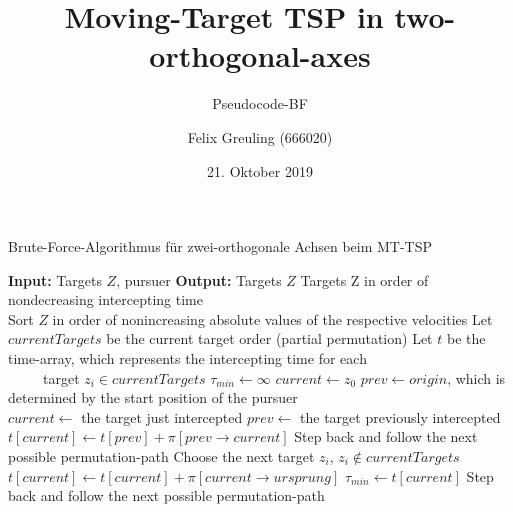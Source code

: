 \documentclass{scrartcl}
\title{Moving-Target TSP in two-orthogonal-axes}
\subtitle{Pseudocode-BF}
\author{Felix Greuling (666020)}
\date{21. Oktober 2019}
\begin{document}
\maketitle

\begin{minipage}{1\linewidth}
\begin{algorithm}[H]
\begin{algorithmic}
\caption{Brute-Force-Algorithmus für zwei-orthogonale Achsen beim MT-TSP}
\label{alg:BF}
\State \textbf{Input:} Targets $Z$, pursuer
\State \textbf{Output:} Targets $Z$ Targets Z in order of nondecreasing intercepting time\\

\State Sort $Z$ in order of nonincreasing absolute values of the respective velocities
\State Let $currentTargets$ be the current target order (partial permutation)
\State Let $t$ be the time-array, which represents the intercepting time for each \\
~~~~~target $z_i\in currentTargets$ 
\State $\tau_{min}\leftarrow \infty$
\State $current\leftarrow z_0$
\State $prev\leftarrow origin$, which is determined by the start position of the pursuer\\

\State $current\leftarrow$ the target just intercepted
\State $prev\leftarrow$ the target previously intercepted 
\State $t[current] \leftarrow t[prev] + \pi[prev\rightarrow current]$
\State Step back and follow the next possible permutation-path
\Else
{}
\State Choose the next target $z_i$, $z_i\notin currentTargets$
\Else
\State $t[current]\leftarrow t[current] + \pi[current\rightarrow ursprung]$ 
\State $\tau_{min}\leftarrow t[current]$
\State Step back and follow the next possible permutation-path
\EndIf 
\EndIf
\EndIf
\EndWhile
\end{algorithmic}
\end{algorithm}
\end{minipage}
\end{document}
